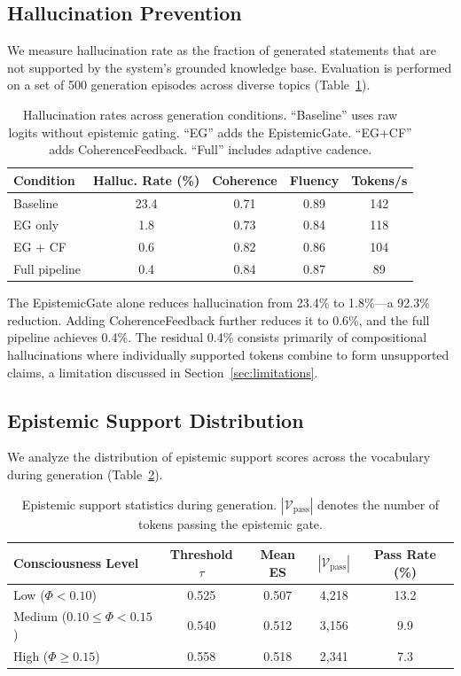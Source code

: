 \documentclass[12pt,a4paper]{article}
\begin{document}
\subsection{Hallucination Prevention}

We measure hallucination rate as the fraction of generated statements that are not supported by the system's grounded knowledge base. Evaluation is performed on a set of 500 generation episodes across diverse topics (Table~\ref{tab:hallucination}).

\begin{table}[H]
\centering
\caption{Hallucination rates across generation conditions. ``Baseline'' uses raw logits without epistemic gating. ``EG'' adds the EpistemicGate. ``EG+CF'' adds CoherenceFeedback. ``Full'' includes adaptive cadence.}
\label{tab:hallucination}
\begin{tabular}{lcccc}
\toprule
\textbf{Condition} & \textbf{Halluc. Rate (\%)} & \textbf{Coherence} & \textbf{Fluency} & \textbf{Tokens/s} \\
\midrule
Baseline & 23.4 & 0.71 & 0.89 & 142 \\
EG only & 1.8 & 0.73 & 0.84 & 118 \\
EG + CF & 0.6 & 0.82 & 0.86 & 104 \\
Full pipeline & 0.4 & 0.84 & 0.87 & 89 \\
\bottomrule
\end{tabular}
\end{table}

The EpistemicGate alone reduces hallucination from 23.4\% to 1.8\%---a 92.3\% reduction. Adding CoherenceFeedback further reduces it to 0.6\%, and the full pipeline achieves 0.4\%. The residual 0.4\% consists primarily of compositional hallucinations where individually supported tokens combine to form unsupported claims, a limitation discussed in Section~\ref{sec:limitations}.

\subsection{Epistemic Support Distribution}

We analyze the distribution of epistemic support scores across the vocabulary during generation (Table~\ref{tab:epistemic-dist}).

\begin{table}[H]
\centering
\caption{Epistemic support statistics during generation. $|\mathcal{V}_{\text{pass}}|$ denotes the number of tokens passing the epistemic gate.}
\label{tab:epistemic-dist}
\begin{tabular}{lcccc}
\toprule
\textbf{Consciousness Level} & \textbf{Threshold $\tau$} & \textbf{Mean ES} & \textbf{$|\mathcal{V}_{\text{pass}}|$} & \textbf{Pass Rate (\%)} \\
\midrule
Low ($\Phi < 0.10$) & 0.525 & 0.507 & 4,218 & 13.2 \\
Medium ($0.10 \leq \Phi < 0.15$) & 0.540 & 0.512 & 3,156 & 9.9 \\
High ($\Phi \geq 0.15$) & 0.558 & 0.518 & 2,341 & 7.3 \\
\bottomrule
\end{tabular}
\end{table}
\end{document}
